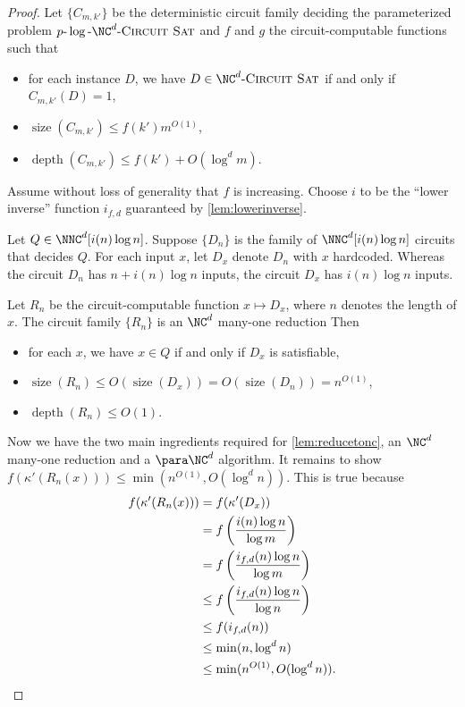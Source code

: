 \documentclass{article}
\newcommand{\dash}{\textnormal{-}}
\newcommand{\pncsat}{p\dash\log\dash\NC^d\dash\textsc{Circuit Sat}}
\DeclareMathOperator{\depth}{depth}
\DeclareMathOperator{\size}{size}
\begin{document}
\begin{proof}
  Let $\{C_{m, k'}\}$ be the deterministic circuit family deciding the parameterized problem $\pncsat$ and $f$ and $g$ the circuit-computable functions such that
  \begin{itemize}
  \item for each instance $D$, we have $D \in \NC^d\textnormal{-}\textsc{Circuit Sat}$ if and only if $C_{m, k'}(D) = 1$,
  \item $\size(C_{m, k'}) \leq f(k') m^{O(1)}$,
  \item $\depth(C_{m, k'}) \leq f(k') + O(\log^d m)$.
  \end{itemize}
  Assume without loss of generality that $f$ is increasing.
  Choose $i$ to be the ``lower inverse'' function $i_{f, d}$ guaranteed by \autoref{lem:lowerinverse}.

  Let $Q \in \NNC^d[i(n) \log n]$.
  Suppose $\{D_n\}$ is the family of $\NNC^d[i(n) \log n]$ circuits that decides $Q$.
  For each input $x$, let $D_x$ denote $D_n$ with $x$ hardcoded.
  Whereas the circuit $D_n$ has $n + i(n) \log n$ inputs, the circuit $D_x$ has $i(n) \log n$ inputs.

  Let $R_n$ be the circuit-computable function $x \mapsto D_x$, where $n$ denotes the length of $x$.
  The circuit family $\{R_n\}$ is an $\NC^d$ many-one reduction
  Then
  \begin{itemize}
  \item for each $x$, we have $x \in Q$ if and only if $D_x$ is satisfiable,
  \item $\size(R_n) \leq O(\size(D_x)) = O(\size(D_n)) = n^{O(1)}$,
  \item $\depth(R_n) \leq O(1)$.
  \end{itemize}
  Now we have the two main ingredients required for \autoref{lem:reducetonc}, an $\NC^d$ many-one reduction and a $\para \NC^d$ algorithm.
  It remains to show $f(\kappa'(R_n(x))) \leq \min(n^{O(1)}, O(\log^d n))$.
  This is true because
  \begin{align*}
    f(\kappa'(R_n(x))) & = f(\kappa'(D_x)) \\
    & = f\left(\frac{i(n) \log n}{\log m}\right) \\
    & = f\left(\frac{i_{f, d}(n) \log n}{\log m}\right) \\
    & \leq f\left(\frac{i_{f, d}(n) \log n}{\log n}\right) \\
    & \leq f(i_{f, d}(n)) \\
    & \leq \min(n, \log^d n) \\
    & \leq \min(n^{O(1)}, O(\log^d n)). \qedhere
  \end{align*}
\end{proof}
\end{document}
